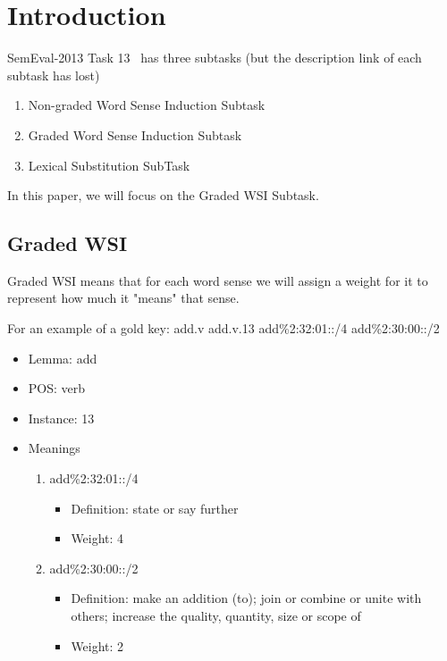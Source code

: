 \section{Introduction}
\label{sec:introduction}

SemEval-2013 Task 13~\cite{jurgens2013semeval} has three subtasks (but the description link of each subtask has lost)

\begin{enumerate}
    \item Non-graded Word Sense Induction Subtask
    \item Graded Word Sense Induction Subtask
    \item Lexical Substitution SubTask
\end{enumerate}

In this paper, we will focus on the Graded WSI Subtask.

\subsection*{Graded WSI}

Graded WSI means that for each word sense we will assign a weight for it to represent how much it "means" that sense.

For an example of a gold key: add.v add.v.13 add\%2:32:01::/4 add\%2:30:00::/2

\begin{itemize}
    \item Lemma: add
    \item POS: verb
    \item Instance: 13
    \item Meanings
        \begin{enumerate}
            \item add\%2:32:01::/4
                \begin{itemize}
                    \item Definition: state or say further
                    \item Weight: 4
                \end{itemize}
            \item add\%2:30:00::/2
                \begin{itemize}
                    \item Definition: make an addition (to); join or combine or unite with others; increase the quality, quantity, size or scope of
                    \item Weight: 2
                \end{itemize}
        \end{enumerate}
\end{itemize}

